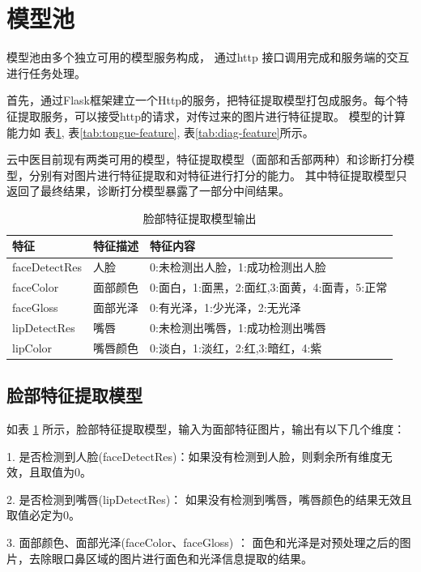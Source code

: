 \section{模型池}

模型池由多个独立可用的模型服务构成， 通过http 接口调用完成和服务端的交互进行任务处理。

首先，通过Flask框架建立一个Http的服务，把特征提取模型打包成服务。每个特征提取服务，可以接受http的请求，对传过来的图片进行特征提取。
模型的计算能力如 表\ref{tab:face-feature}, 表\ref{tab:tongue-feature}, 表\ref{tab:diag-feature}所示。

云中医目前现有两类可用的模型，特征提取模型（面部和舌部两种）和诊断打分模型，分别有对图片进行特征提取和对特征进行打分的能力。
其中特征提取模型只返回了最终结果，诊断打分模型暴露了一部分中间结果。

\begin{table}[]
    \centering
    \begin{tabular}{lll}
        \toprule
        特征          & 特征描述     & 特征内容 \\ 
        \midrule
        faceDetectRes & 人脸   & 0:未检测出人脸，1:成功检测出人脸  \\
        faceColor     & 面部颜色 & 0:面白，1:面黑，2:面红,3:面黄，4:面青，5:正常 \\
        faceGloss     & 面部光泽 & 0:有光泽，1:少光泽，2:无光泽\\
        lipDetectRes  & 嘴唇   & 0:未检测出嘴唇，1:成功检测出嘴唇\\
        lipColor      & 嘴唇颜色 & 0:淡白，1:淡红，2:红,3:暗红，4:紫   \\
        \bottomrule
    \end{tabular}
    \caption{脸部特征提取模型输出}
    \label{tab:face-feature}
\end{table}

\subsection{脸部特征提取模型}
如表 \ref{tab:face-feature} 所示，脸部特征提取模型，输入为面部特征图片，输出有以下几个维度：

1. 是否检测到人脸(faceDetectRes)：如果没有检测到人脸，则剩余所有维度无效，且取值为0。

2. 是否检测到嘴唇(lipDetectRes)： 如果没有检测到嘴唇，嘴唇颜色的结果无效且取值必定为0。

3. 面部颜色、面部光泽(faceColor、faceGloss) ： 面色和光泽是对预处理之后的图片，去除眼口鼻区域的图片进行面色和光泽信息提取的结果。

